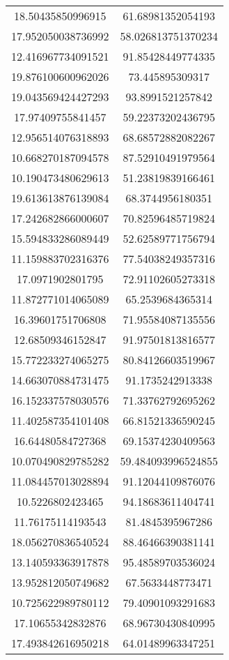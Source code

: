 \begin{table}
\begin{tabular}{cc}
18.50435850996915 & 61.68981352054193 \\
17.952050038736992 & 58.026813751370234 \\
12.416967734091521 & 91.85428449774335 \\
19.876100600962026 & 73.445895309317 \\
19.043569424427293 & 93.8991521257842 \\
17.97409755841457 & 59.22373202436795 \\
12.956514076318893 & 68.68572882082267 \\
10.668270187094578 & 87.52910491979564 \\
10.190473480629613 & 51.23819839166461 \\
19.613613876139084 & 68.3744956180351 \\
17.242682866000607 & 70.82596485719824 \\
15.594833286089449 & 52.62589771756794 \\
11.159883702316376 & 77.54038249357316 \\
17.0971902801795 & 72.91102605273318 \\
11.872771014065089 & 65.2539684365314 \\
16.39601751706808 & 71.95584087135556 \\
12.68509346152847 & 91.97501813816577 \\
15.772233274065275 & 80.84126603519967 \\
14.663070884731475 & 91.1735242913338 \\
16.152337578030576 & 71.33762792695262 \\
11.402587354101408 & 66.81521336590245 \\
16.64480584727368 & 69.15374230409563 \\
10.070490829785282 & 59.484093996524855 \\
11.084457013028894 & 91.12044109876076 \\
10.5226802423465 & 94.18683611404741 \\
11.76175114193543 & 81.4845395967286 \\
18.056270836540524 & 88.46466390381141 \\
13.140593363917878 & 95.48589703536024 \\
13.952812050749682 & 67.5633448773471 \\
10.725622989780112 & 79.40901093291683 \\
17.10655342832876 & 68.96730430840995 \\
17.493842616950218 & 64.01489963347251 \\

\end{tabular}
\end{table}
